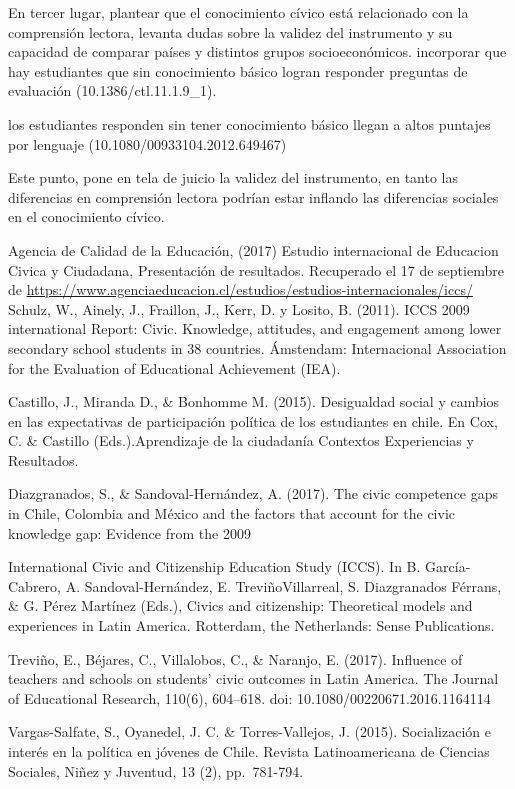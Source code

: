 \documentclass[
]{article}
\begin{document}
En tercer lugar, plantear que el conocimiento cívico está relacionado
con la comprensión lectora, levanta dudas sobre la validez del
instrumento y su capacidad de comparar países y distintos grupos
socioeconómicos. incorporar que hay estudiantes que sin conocimiento
básico logran responder preguntas de evaluación (10.1386/ctl.11.1.9\_1).

los estudiantes responden sin tener conocimiento básico llegan a altos
puntajes por lenguaje (10.1080/00933104.2012.649467)

Este punto, pone en tela de juicio la validez del instrumento, en tanto
las diferencias en comprensión lectora podrían estar inflando las
diferencias sociales en el conocimiento cívico.

Agencia de Calidad de la Educación, (2017) Estudio internacional de
Educacion Civica y Ciudadana, Presentación de resultados. Recuperado el
17 de septiembre de
\url{https://www.agenciaeducacion.cl/estudios/estudios-internacionales/iccs/}
Schulz, W., Ainely, J., Fraillon, J., Kerr, D. y Losito, B. (2011). ICCS
2009 international Report: Civic. Knowledge, attitudes, and engagement
among lower secondary school students in 38 countries. Ámstendam:
Internacional Association for the Evaluation of Educational Achievement
(IEA).

Castillo, J., Miranda D., \& Bonhomme M. (2015). Desigualdad social y
cambios en las expectativas de participación política de los estudiantes
en chile. En Cox, C. \& Castillo (Eds.).Aprendizaje de la ciudadanía
Contextos Experiencias y Resultados.

Diazgranados, S., \& Sandoval-Hernández, A. (2017). The civic competence
gaps in Chile, Colombia and México and the factors that account for the
civic knowledge gap: Evidence from the 2009

International Civic and Citizenship Education Study (ICCS). In B.
García-Cabrero, A. Sandoval-Hernández, E. TreviñoVillarreal, S.
Diazgranados Férrans, \& G. Pérez Martínez (Eds.), Civics and
citizenship: Theoretical models and experiences in Latin America.
Rotterdam, the Netherlands: Sense Publications.

Treviño, E., Béjares, C., Villalobos, C., \& Naranjo, E. (2017).
Influence of teachers and schools on students' civic outcomes in Latin
America. The Journal of Educational Research, 110(6), 604--618. doi:
10.1080/00220671.2016.1164114

Vargas-Salfate, S., Oyanedel, J. C. \& Torres-Vallejos, J. (2015).
Socialización e interés en la política en jóvenes de Chile. Revista
Latinoamericana de Ciencias Sociales, Niñez y Juventud, 13 (2),
pp.~781-794.
\end{document}
